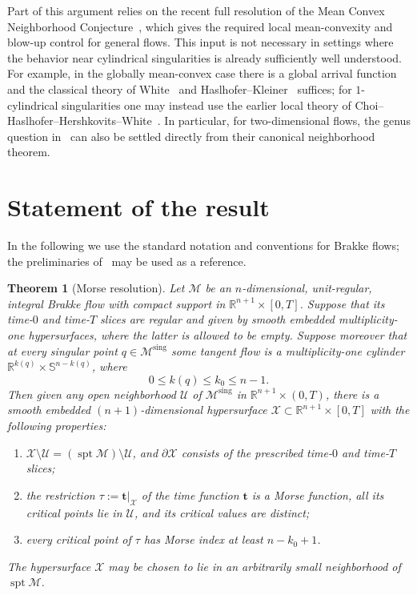 \documentclass[12pt,twoside,reqno]{amsart}
\newcommand{\IR}{\mathbb{R}}
\newcommand{\IS}{\mathbb{S}}
\newcommand{\UU}{\mathcal{U}}
\newcommand{\MM}{\mathcal{M}}
\newcommand{\XX}{\mathcal{X}}
\DeclareMathOperator{\sing}{sing}
\DeclareMathOperator{\spt}{spt}
\newtheorem{Theorem}[equation]{Theorem}
\theoremstyle{definition}
\theoremstyle{remark}
\numberwithin{equation}{section}
\begin{document}
Part of this argument relies on the recent full resolution of the Mean Convex Neighborhood Conjecture~\cite{BamlerLai}, which gives the required local mean-convexity and blow-up control for general flows.
This input is not necessary in settings where the behavior near cylindrical singularities is already sufficiently well understood.
For example, in the globally mean-convex case there is a global arrival function and the classical theory of White~\cite{WhiteNature,WhiteSubsequent} and Haslhofer--Kleiner~\cite{HaslhoferKleiner} suffices; for $1$-cylindrical singularities one may instead use the earlier local theory of Choi--Haslhofer--Hershkovits--White~\cite{ChoiHaslhoferHershkovitsWhite}.
In particular, for two-dimensional flows, the genus question in~\cite{WhiteGenus} can also be settled directly from their canonical neighborhood theorem.


\section{Statement of the result}

In the following we use the standard notation and conventions for Brakke flows; the preliminaries of~\cite{BamlerLai} may be used as a reference.

\begin{Theorem}[Morse resolution]\label{Thm_main}
Let $\MM$ be an $n$-dimensional, unit-regular, integral Brakke flow with compact support in $\IR^{n+1}\times[0,T]$.
Suppose that its time-$0$ and time-$T$ slices are regular and given by smooth embedded multiplicity-one hypersurfaces, where the latter is allowed to be empty.
Suppose moreover that at every singular point $q\in\MM^{\sing}$ some tangent flow is a multiplicity-one cylinder $\IR^{k(q)}\times\IS^{n-k(q)}$, where
\[
 0\leq k(q)\leq k_0\leq n-1.
\]
Then given any open neighborhood $\UU$ of $\MM^{\sing}$ in $\IR^{n+1}\times(0,T)$, there is a smooth embedded $(n+1)$-dimensional hypersurface $\XX\subset\IR^{n+1}\times[0,T]$ with the following properties:
\begin{enumerate}[label=\textup{(\alph*)}]
\item $\XX\setminus\UU=(\spt\MM)\setminus\UU$, and $\partial\XX$ consists of the prescribed time-$0$ and time-$T$ slices;
\item the restriction $\tau:=\mathbf{t}|_{\XX}$ of the time function $\mathbf{t}$ is a Morse function, all its critical points lie in $\UU$, and its critical values are distinct;
\item every critical point of $\tau$ has Morse index at least $n-k_0+1$.
\end{enumerate}
The hypersurface $\XX$ may be chosen to lie in an arbitrarily small neighborhood of $\spt\MM$.
\end{Theorem}
\end{document}

